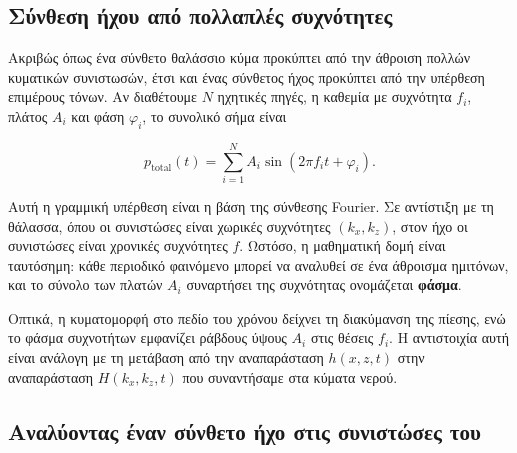 \documentclass[a4paper, 11pt]{article}
\begin{document}
\subsection{Σύνθεση ήχου από πολλαπλές
συχνότητες}\label{ux3c3ux3cdux3bdux3b8ux3b5ux3c3ux3b7-ux3aeux3c7ux3bfux3c5-ux3b1ux3c0ux3cc-ux3c0ux3bfux3bbux3bbux3b1ux3c0ux3bbux3adux3c2-ux3c3ux3c5ux3c7ux3bdux3ccux3c4ux3b7ux3c4ux3b5ux3c2}

Ακριβώς όπως ένα σύνθετο θαλάσσιο κύμα προκύπτει από την άθροιση πολλών
κυματικών συνιστωσών, έτσι και ένας σύνθετος ήχος προκύπτει από την
υπέρθεση επιμέρους τόνων. Αν διαθέτουμε \(N\) ηχητικές πηγές, η καθεμία
με συχνότητα \(f_i\), πλάτος \(A_i\) και φάση \(\varphi_i\), το συνολικό
σήμα είναι

\[
p_{\text{total}}(t) = \sum_{i=1}^{N} A_i \sin(2\pi f_i t + \varphi_i).
\]

Αυτή η γραμμική υπέρθεση είναι η βάση της σύνθεσης Fourier. Σε αντίστιξη
με τη θάλασσα, όπου οι συνιστώσες είναι χωρικές συχνότητες
\((k_x, k_z)\), στον ήχο οι συνιστώσες είναι χρονικές συχνότητες \(f\).
Ωστόσο, η μαθηματική δομή είναι ταυτόσημη: κάθε περιοδικό φαινόμενο
μπορεί να αναλυθεί σε ένα άθροισμα ημιτόνων, και το σύνολο των πλατών
\(A_i\) συναρτήσει της συχνότητας ονομάζεται \textbf{φάσμα}.

Οπτικά, η κυματομορφή στο πεδίο του χρόνου δείχνει τη διακύμανση της
πίεσης, ενώ το φάσμα συχνοτήτων εμφανίζει ράβδους ύψους \(A_i\) στις
θέσεις \(f_i\). Η αντιστοιχία αυτή είναι ανάλογη με τη μετάβαση από την
αναπαράσταση \(h(x,z,t)\) στην αναπαράσταση \(H(k_x,k_z,t)\) που
συναντήσαμε στα κύματα νερού.

\subsection{Αναλύοντας έναν σύνθετο ήχο στις συνιστώσες
του}\label{ux3b1ux3bdux3b1ux3bbux3cdux3bfux3bdux3c4ux3b1ux3c2-ux3adux3bdux3b1ux3bd-ux3c3ux3cdux3bdux3b8ux3b5ux3c4ux3bf-ux3aeux3c7ux3bf-ux3c3ux3c4ux3b9ux3c2-ux3c3ux3c5ux3bdux3b9ux3c3ux3c4ux3ceux3c3ux3b5ux3c2-ux3c4ux3bfux3c5}
\end{document}

